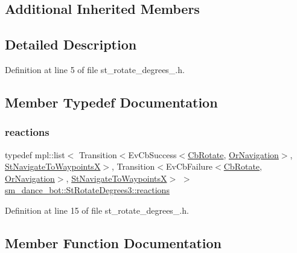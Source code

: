 \subsection*{Additional Inherited Members}


\subsection{Detailed Description}


Definition at line 5 of file st\+\_\+rotate\+\_\+degrees\+\_.\+h.



\subsection{Member Typedef Documentation}
\mbox{\label{structsm__dance__bot_1_1StRotateDegrees3_a5ee2b598665a4c42a614c1f4dbe4e8cc}} 
\subsubsection{\texorpdfstring{reactions}{reactions}}
{\footnotesize\ttfamily typedef mpl\+::list$<$ Transition$<$Ev\+Cb\+Success$<$\hyperlink{classcl__move__base__z_1_1CbRotate}{Cb\+Rotate}, \hyperlink{classsm__dance__bot_1_1OrNavigation}{Or\+Navigation}$>$, \hyperlink{structsm__dance__bot_1_1StNavigateToWaypointsX}{St\+Navigate\+To\+WaypointsX}$>$, Transition$<$Ev\+Cb\+Failure$<$\hyperlink{classcl__move__base__z_1_1CbRotate}{Cb\+Rotate}, \hyperlink{classsm__dance__bot_1_1OrNavigation}{Or\+Navigation}$>$, \hyperlink{structsm__dance__bot_1_1StNavigateToWaypointsX}{St\+Navigate\+To\+WaypointsX}$>$ $>$ \hyperlink{structsm__dance__bot_1_1StRotateDegrees3_a5ee2b598665a4c42a614c1f4dbe4e8cc}{sm\+\_\+dance\+\_\+bot\+::\+St\+Rotate\+Degrees3\+::reactions}}



Definition at line 15 of file st\+\_\+rotate\+\_\+degrees\+\_.\+h.



\subsection{Member Function Documentation}
\mbox{\label{structsm__dance__bot_1_1StRotateDegrees3_a8156b512fa51ed1be24f5099ee9481be}} 
